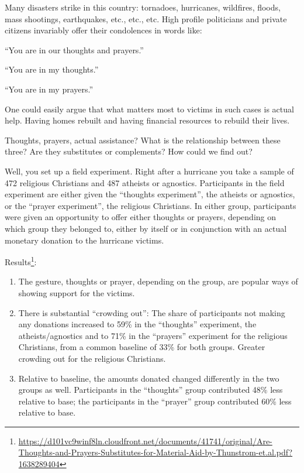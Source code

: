 \documentclass[
]{book}
\providecommand{\tightlist}{%
  \setlength{\itemsep}{0pt}\setlength{\parskip}{0pt}}
\begin{document}
Many disasters strike in this country: tornadoes, hurricanes, wildfires, floods, mass shootings, earthquakes, etc., etc., etc. High profile politicians and private citizens invariably offer their condolences in words like:

\begin{center}
``You are in our thoughts and prayers.''

``You are in my thoughts.''

``You are in my prayers.''

\end{center}

One could easily argue that what matters most to victims in such cases is actual help. Having homes rebuilt and having financial resources to rebuild their lives.

Thoughts, prayers, actual assistance? What is the relationship between these three? Are they substitutes or complements? How could we find out?

Well, you set up a field experiment. Right after a hurricane you take a sample of 472 religious Christians and 487 atheists or agnostics. Participants in the field experiment are either given the ``thoughts experiment'', the atheists or agnostics, or the ``prayer experiment'', the religious Christians. In either group, participants were given an opportunity to offer either thoughts or prayers, depending on which group they belonged to, either by itself or in conjunction with an actual monetary donation to the hurricane victims.

Results\footnote{\url{https://d101vc9winf8ln.cloudfront.net/documents/41741/original/Are-Thoughts-and-Prayers-Substitutes-for-Material-Aid-by-Thunstrom-et.al.pdf?1638289404}}:

\begin{enumerate}
\def\labelenumi{\arabic{enumi}.}
\tightlist
\item
  The gesture, thoughts or prayer, depending on the group, are popular ways of showing support for the victims.
\item
  There is substantial ``crowding out'': The share of participants not making any donations increased to 59\% in the ``thoughts'' experiment, the atheists/agnostics and to 71\% in the ``prayers'' experiment for the religious Christians, from a common baseline of 33\% for both groups. Greater crowding out for the religious Christians.
\item
  Relative to baseline, the amounts donated changed differently in the two groups as well. Participants in the ``thoughts'' group contributed 48\% less relative to base; the participants in the ``prayer'' group contributed 60\% less relative to base.
\end{enumerate}
\end{document}
